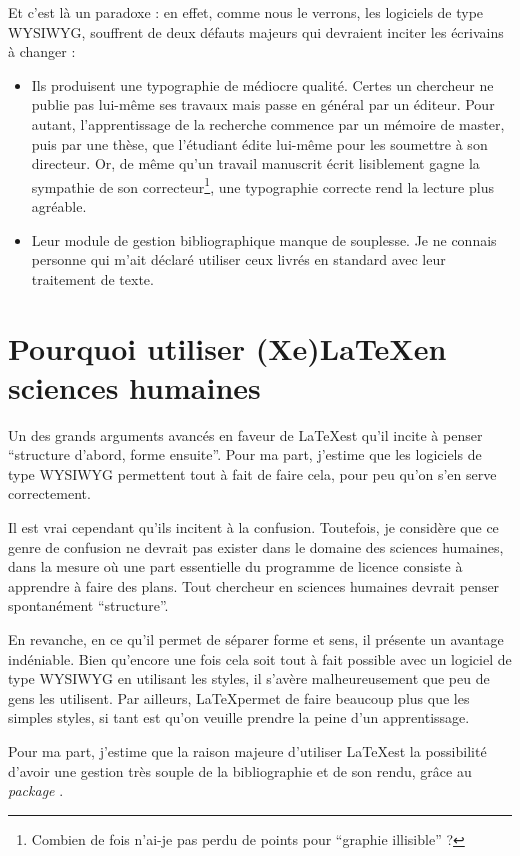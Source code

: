 Et c'est là un paradoxe : en effet, comme nous le verrons, les logiciels de type WYSIWYG, souffrent de deux défauts majeurs qui devraient inciter les écrivains à changer :
\begin{itemize}
\item Ils produisent une typographie de médiocre qualité. Certes un chercheur ne publie pas lui-même ses travaux mais passe en général par un éditeur. Pour autant, l'apprentissage de la recherche commence par un mémoire de master, puis par une thèse, que l'étudiant édite lui-même pour les soumettre à son directeur. Or, de même qu'un travail manuscrit écrit lisiblement gagne la sympathie de son correcteur\footnote{Combien de fois n'ai-je pas perdu de points pour \enquote{graphie illisible} ?},  une typographie correcte rend la lecture plus agréable.
\item Leur module de gestion bibliographique manque de souplesse. Je ne connais personne qui m'ait déclaré utiliser ceux livrés en standard avec leur traitement de texte.
\end{itemize}

\section{Pourquoi utiliser (Xe)\LaTeX en sciences humaines}

Un des grands arguments avancés en faveur de \LaTeX est qu'il incite à penser \enquote{structure d'abord, forme ensuite}. Pour ma part, j'estime que les logiciels de type WYSIWYG permettent tout à fait de faire cela, pour peu qu'on s'en serve correctement. 

Il est vrai cependant qu'ils incitent à la confusion. Toutefois, je considère que ce genre de confusion ne devrait pas exister dans le domaine des sciences humaines, dans la mesure où une part essentielle du programme de licence consiste à apprendre à faire des plans. Tout chercheur en sciences humaines devrait penser spontanément \enquote{structure}.

En revanche, en ce qu'il permet de séparer forme et sens, il présente un avantage indéniable. Bien qu'encore une fois cela soit tout à fait possible avec un logiciel de type WYSIWYG en utilisant les styles,  il s'avère malheureusement que peu de gens les utilisent. Par ailleurs, \LaTeX permet de faire beaucoup plus que les simples styles, si tant est qu'on veuille prendre la peine d'un apprentissage.

Pour ma part, j'estime que la raison majeure d'utiliser \LaTeX est la possibilité d'avoir une gestion très souple de la bibliographie et de son rendu, grâce au \emph{package} . 

